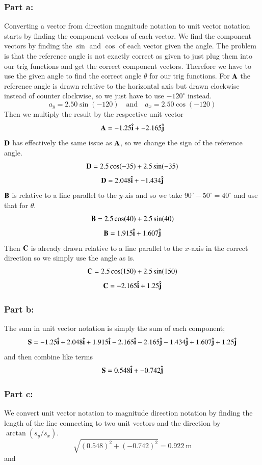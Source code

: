 \documentclass{article}
\begin{document}
\subsubsection*{Part a:}
Converting a vector from direction magnitude notation to unit vector notation starts by finding the component vectors of each vector.
We find the component vectors by finding the $\sin$ and $\cos$ of each vector given the angle.
The problem is that the reference angle is not exactly correct as given to just plug them into our trig functions and get the correct component vectors.
Therefore we have to use the given angle to find the correct angle $\theta$ for our trig functions.
For $\vb A$ the reference angle is drawn relative to the horizontal axis but drawn clockwise instead of counter clockwise, so we just have to use $-120^\circ$ instead.
\[
	a_y = 2.50\sin(-120) \quad \text{and} \quad a_x = 2.50\cos(-120)
\]
Then we multiply the result by the respective unit vector
\[
	\vb A = -1.25 \vu i + -2.165 \vu j
\]
$\vb D$ has effectively the same issue as $\vb A$, so we change the sign of the reference angle.
\[
	\vb D = 2.5\cos(-35) + 2.5\sin(-35)
\]
\[
	\vb D = 2.048 \vu i + -1.434 \vu j
\]
$\vb B$ is relative to a line parallel to the $y$-xis and so we take $90^\circ - 50^\circ = 40^\circ$ and use that for $\theta$.
\[
	\vb B = 2.5\cos(40) + 2.5\sin(40)
\]
\[
	\vb B = 1.915 \vu i + 1.607 \vu j
\]
Then $\vb C$ is already drawn relative to a line parallel to the $x$-axis in the correct direction so we simply use the angle as is.
\[
	\vb C = 2.5\cos(150) + 2.5\sin(150)
\]
\[
	\vb C = -2.165 \vu i + 1.25\vu j
\]

\subsubsection*{Part b:}
The sum in unit vector notation is simply the sum of each component;
\[
	\vb S = -1.25 \vu i + 2.048 \vu i + 1.915 \vu i -2.165 \vu i -2.165 \vu j -1.434 \vu j + 1.607 \vu j + 1.25\vu j
\]
and then combine like terms
\[
	\vb S = 0.548 \vu i + -0.742 \vu j
\]

\subsubsection*{Part c:}
We convert unit vector notation to magnitude direction notation by finding the length of the line connecting to two unit vectors and the direction by $\arctan (s_y/s_x)$.
\[
	\sqrt{\left(0.548\right)^2 + \left(-0.742\right)^2} = 0.922\ \text{m}
\]
and
\end{document}

